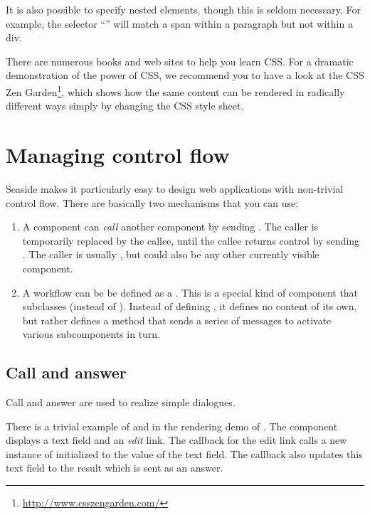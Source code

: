 \documentclass[a4paper,10pt,twoside]{book}
\begin{document}
It is also possible to specify nested elements, though this is seldom necessary.
For example, the selector ``'' will match a span within a paragraph but not within a div.

There are numerous books and web sites to help you learn CSS.
For a dramatic demonstration of the power of CSS, we recommend you to have a look at the CSS Zen Garden\footnote{\url{http://www.csszengarden.com/}}, which shows how the same content can be rendered in radically different ways simply by changing the CSS style sheet.

\section{Managing control flow}

Seaside makes it particularly easy to design web applications with non-trivial control flow.
There are basically two mechanisms that you can use:

\begin{enumerate}
  \item A component can \emph{call} another component by sending .
  The caller is temporarily replaced by the callee, until the callee returns control by sending .
  The caller is usually , but could also be any other currently visible component.

  \item A workflow can be be defined as a .
  This is a special kind of component that subclasses  (instead of ). \label{sec:task}
  Instead of defining , it defines no content of its own, but rather defines a  method that sends a series of  messages to activate various subcomponents in turn.
\end{enumerate}

\subsection{Call and answer}

Call and answer are used to realize simple dialogues.

There is a trivial example of  and  in the rendering demo of .
The component  displays a text field and an \emph{edit} link.
The callback for the edit link calls a new instance of  initialized to the value of the text field.
The callback also updates this text field to the result which is sent as an answer.
\end{document}

